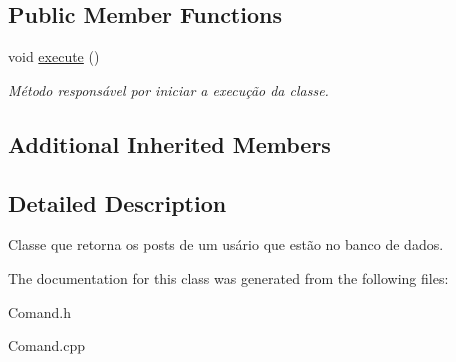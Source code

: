 \subsection*{Public Member Functions}
\begin{DoxyCompactItemize}
\item 
\hypertarget{class_command_find_user_post_a2a28fed7b287b88274b60d8e4524f6de}{void \hyperlink{class_command_find_user_post_a2a28fed7b287b88274b60d8e4524f6de}{execute} ()}\label{class_command_find_user_post_a2a28fed7b287b88274b60d8e4524f6de}

\begin{DoxyCompactList}\small\item\em Método responsável por iniciar a execução da classe. \end{DoxyCompactList}\end{DoxyCompactItemize}
\subsection*{Additional Inherited Members}


\subsection{Detailed Description}
Classe que retorna os posts de um usário que estão no banco de dados. 

The documentation for this class was generated from the following files\-:\begin{DoxyCompactItemize}
\item 
Comand.\-h\item 
Comand.\-cpp\end{DoxyCompactItemize}
